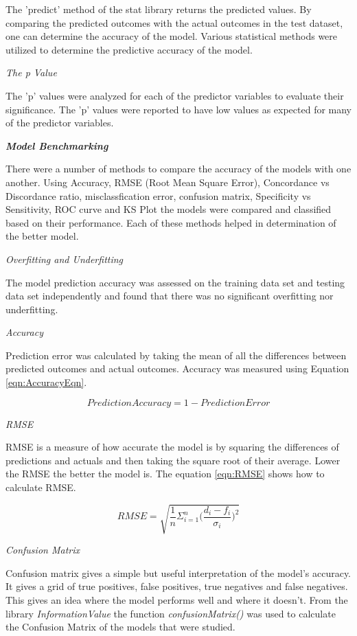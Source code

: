 \documentclass{bioinfo}
\begin{document}
\begin{methods}
The 'predict' method of the stat library returns the predicted values. By comparing the predicted outcomes with the actual outcomes in the test dataset, one can determine the accuracy of the model.  Various statistical methods were utilized to determine the predictive accuracy of the model.

{\it The p Value}

The 'p' values were analyzed for each of the predictor variables to evaluate their significance. The 'p' values were reported to have low values as expected for many of the predictor variables.

{\textbf {\emph{Model Benchmarking}}}

There were a number of methods to compare the accuracy of the models with one another. Using Accuracy, RMSE (Root Mean Square Error), Concordance vs Discordance ratio, misclassfication error, confusion matrix, Specificity vs Sensitivity, ROC curve and KS Plot the models were compared and classified based on their performance. Each of these methods helped in determination of the better model. 

{\it Overfitting and Underfitting}

The model prediction accuracy was assessed on the training data set and testing data set independently and found that there was no significant overfitting nor underfitting. 

{\it Accuracy}

Prediction error was calculated by taking the mean of all the differences between predicted outcomes and actual outcomes. Accuracy was measured using Equation \ref{eqn:AccuracyEqn}.

\begin{equation}
\label{eqn:AccuracyEqn}
    PredictionAccuracy = 1 - PredictionError
\end{equation}


{\it RMSE}

RMSE is a measure of how accurate the model is by squaring the differences of predictions and actuals and then taking the square root of their average. Lower the RMSE the better the model is. The equation \ref{eqn:RMSE} shows how to calculate RMSE. 

\begin{equation}
\label{eqn:RMSE}
RMSE = \sqrt{\frac{1}{n}\Sigma_{i=1}^{n}{\Big(\frac{d_i -f_i}{\sigma_i}\Big)^2}}
\end{equation}

{\it Confusion Matrix}

Confusion matrix gives a simple but useful interpretation of the model's accuracy. It gives a grid of true positives, false positives, true negatives and false negatives. This gives an idea where the model performs well and where it doesn't. From the library {\it InformationValue} the function {\it confusionMatrix()} was used to calculate the Confusion Matrix of the models that were studied.


\end{methods}
\end{document}

